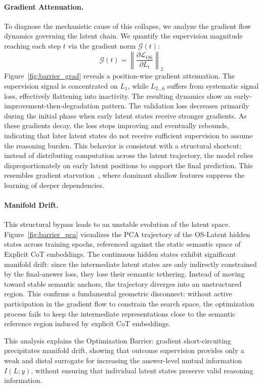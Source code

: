 \paragraph{Gradient Attenuation.}
To diagnose the mechanistic cause of this collapse, we analyze the gradient flow dynamics governing the latent chain. We quantify the supervision magnitude reaching each step $t$ via the gradient norm $\mathcal{G}(t)$:
\begin{equation}
\mathcal{G}(t) = \left\| \frac{\partial \mathcal{L}_{\mathrm{OS}}}{\partial L_t} \right\|_2
\label{eq:grad_norm}
\end{equation}
Figure~\ref{fig:barrier_grad} reveals a position-wise gradient attenuation. The supervision signal is concentrated on $L_1$, while $L_{2\dots6}$ suffers from systematic signal loss, effectively flattening into inactivity.
The resulting dynamics show an early-improvement-then-degradation pattern. The validation loss decreases primarily during the initial phase when early latent states receive stronger gradients. As these gradients decay, the loss stops improving and eventually rebounds, indicating that later latent states do not receive sufficient supervision to assume the reasoning burden. This behavior is consistent with a structural shortcut: instead of distributing computation across the latent trajectory, the model relies disproportionately on early latent positions to support the final prediction. This resembles gradient starvation~\citep{pezeshki2021gradient}, where dominant shallow features suppress the learning of deeper dependencies.

\paragraph{Manifold Drift.}
This structural bypass leads to an unstable evolution of the latent space.
Figure~\ref{fig:barrier_pca} visualizes the PCA trajectory of the OS-Latent hidden states across training epochs, referenced against the static semantic space of Explicit CoT embeddings.
The continuous hidden states exhibit significant manifold drift: since the intermediate latent states are only indirectly constrained by the final-answer loss, they lose their semantic tethering. Instead of moving toward stable semantic anchors, the trajectory diverges into an unstructured region.
This confirms a fundamental geometric disconnect: without active participation in the gradient flow to constrain the search space, the optimization process fails to keep the intermediate representations close to the semantic reference region induced by explicit CoT embeddings.

This analysis explains the Optimization Barrier: gradient short-circuiting precipitates manifold drift, showing that outcome supervision provides only a weak and distal surrogate for increasing the answer-level mutual information $I(L;y)$, without ensuring that individual latent states preserve valid reasoning information.

